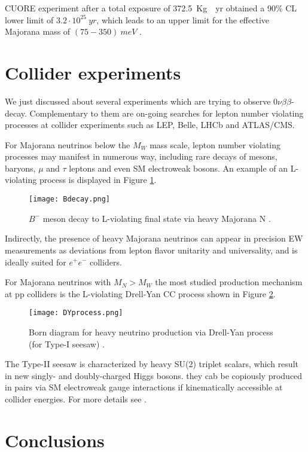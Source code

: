 \documentclass{subnucbo}
\begin{document}
CUORE experiment after a total exposure of \SI{372.5}{Kg\cdot yr} obtained a 90\% CL lower limit of $3.2\cdot10^{25}\SI{}{yr}$, which leads to an upper limit for the effective Majorana mass of $(75-350)\SI{}{meV}$ \cite{ref:cuore}.

\section{Collider experiments}
We just discussed about several experiments which are trying to observe $0\nu\beta\beta$-decay. Complementary to them are on-going searches for lepton number violating processes at collider experiments such as LEP, Belle, LHCb and ATLAS/CMS.

For Majorana neutrinos below the $M_W$ mass scale, lepton number violating processes may manifest in numerous way, including rare decays of mesons, baryons, $\mu$ and $\tau$ leptons and even SM electroweak bosons. An example of an L-violating process is displayed in Figure \ref{fig:Lviol}.
\begin{figure}
\centering
\texttt{[image: Bdecay.png]}
\caption{$B^-$ meson decay to L-violating final state via heavy Majorana N \cite{ref:front}.}
\label{fig:Lviol}
\end{figure}
Indirectly, the presence of heavy Majorana neutrinos can appear in precision EW measurements as deviations from lepton flavor unitarity and universality,  and is ideally suited for $e^+e^-$ colliders.

For Majorana neutrinos with $M_N>M_W$ the most studied production mechanism at pp colliders is the L-violating Drell-Yan CC process shown in Figure \ref{fig:DY}.
\begin{figure}
\centering
\texttt{[image: DYprocess.png]}
\caption{Born diagram for heavy neutrino production via Drell-Yan process (for Type-I seesaw)  \cite{ref:front}.}
\label{fig:DY}
\end{figure}
The Type-II seesaw is characterized by heavy SU(2) triplet scalars, which result in new singly- and doubly-charged Higgs bosons. they cab be copiously produced in pairs via SM electroweak gauge interactions if kinematically accessible at collider energies.
For more details see \cite{ref:front}. 

\section{Conclusions}


\appendix
\end{document}
